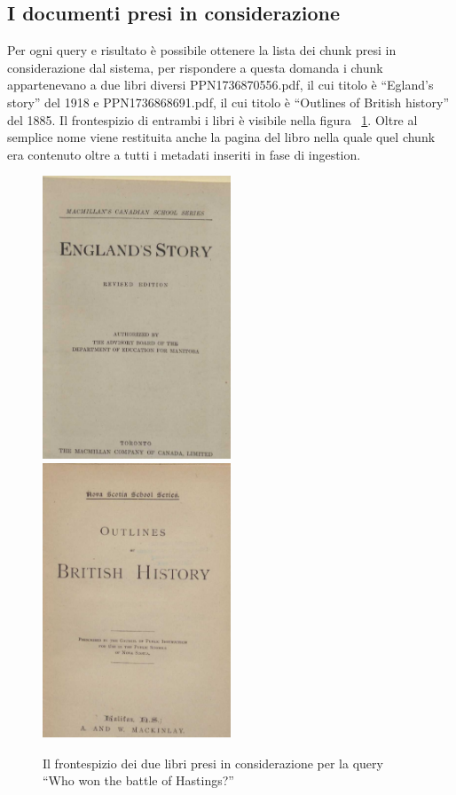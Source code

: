 \subsection{I documenti presi in considerazione}
Per ogni query e risultato è possibile ottenere la lista dei chunk presi in considerazione dal sistema, per rispondere a questa domanda i chunk appartenevano a due libri diversi PPN1736870556.pdf, il cui titolo è ``Egland's story'' del 1918 e PPN1736868691.pdf, il cui titolo è ``Outlines of British history'' del 1885. Il frontespizio di entrambi i libri è visibile nella figura ~\ref{fig:libri}.
Oltre al semplice nome viene restituita anche la pagina del libro nella quale quel chunk era contenuto oltre a tutti i metadati inseriti in fase di ingestion.
\begin{figure}[H]
    \includegraphics[width=0.5\textwidth]{images/engstory.png}
    \includegraphics[width=0.5\textwidth]{images/b_history.png}
    \caption{Il frontespizio dei due libri presi in considerazione per la query ``Who won the battle of Hastings?''}
    \label{fig:libri}
\end{figure}